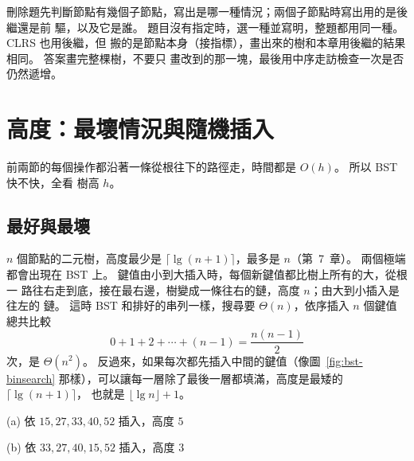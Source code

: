 \begin{examnote}
刪除題先判斷節點有幾個子節點，寫出是哪一種情況；兩個子節點時寫出用的是後繼還是前
驅，以及它是誰。 題目沒有指定時，選一種並寫明，整題都用同一種。 CLRS 也用後繼，但
搬的是節點本身（接指標），畫出來的樹和本章用後繼的結果相同。 答案畫完整棵樹，不要只
畫改到的那一塊，最後用中序走訪檢查一次是否仍然遞增。
\end{examnote}

\section{高度：最壞情況與隨機插入}
\label{sec:bst-height}

前兩節的每個操作都沿著一條從根往下的路徑走，時間都是 $O(h)$。 所以 BST 快不快，全看
樹高 $h$。

\subsection{最好與最壞}

$n$ 個節點的二元樹，高度最少是 $\lceil \lg(n + 1) \rceil$，最多是 $n$（第~7~章）。
兩個極端都會出現在 BST 上。 鍵值由小到大插入時，每個新鍵值都比樹上所有的大，從根一
路往右走到底，接在最右邊，樹變成一條往右的鏈，高度 $n$；由大到小插入是往左的
鏈。 這時 BST 和排好的串列一樣，搜尋要 $\Theta(n)$，依序插入 $n$ 個鍵值總共比較
\[
0 + 1 + 2 + \cdots + (n - 1) = \frac{n(n-1)}{2}
\]
次，是 $\Theta(n^2)$。 反過來，如果每次都先插入中間的鍵值（像圖~\ref{fig:bst-binsearch}
那樣），可以讓每一層除了最後一層都填滿，高度是最矮的 $\lceil \lg(n + 1) \rceil$，
也就是 $\lfloor \lg n \rfloor + 1$。

\begin{center}
\begin{minipage}{0.45\linewidth}\centering
{}

{\footnotesize (a) 依 $15,\allowbreak 27,\allowbreak 33,\allowbreak 40,\allowbreak 52$ 插入，高度 $5$}
\end{minipage}\hfill
\begin{minipage}{0.45\linewidth}\centering
{}

{\footnotesize (b) 依 $33,\allowbreak 27,\allowbreak 40,\allowbreak 15,\allowbreak 52$ 插入，高度 $3$}
\end{minipage}
\label{fig:bst-shapes}
\end{center}


